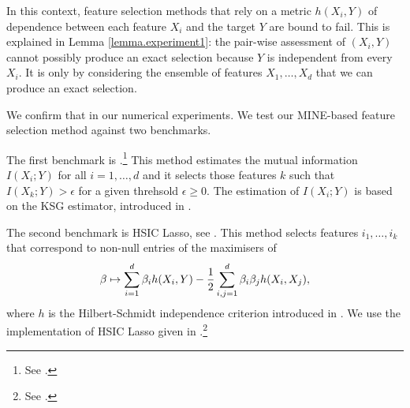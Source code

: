 In this context,
feature selection methods
that rely on a metric $h(X_i, Y)$ of dependence between 
each feature $X_i$ and the target $Y$ are bound to fail.
This is explained in Lemma \ref{lemma.experiment1}:
the pair-wise assessment of $(X_i, Y)$ 
cannot possibly produce an exact selection
because $Y$ is independent from every $X_i$. 
It is only by considering 
the ensemble of features $X_1, \dots, X_d$ 
that we can produce an exact selection.

We confirm that in our numerical experiments. 
We test 
our MINE-based feature selection method 
against 
two benchmarks.

The first benchmark is 
.\footnote{
See
.
}
This method estimates the mutual information 
$I(X_i; Y)$ for all $i = 1, \dots, d$
and 
it selects those features $k$ such that 
$I(X_k; Y) > \epsilon$
for a given threhsold $\epsilon \geq 0$. 
The estimation of $I(X_i; Y)$ is based on the KSG estimator, 
introduced in 
\cite{KSG04est}.

The second benchmark is
HSIC Lasso,
see 
\cite{YJSXS14hig}.
This method 
selects features $i_1, \dots, i_k$
that correspond to non-null entries of the 
maximisers of 
\begin{equation*}
	\beta \mapsto 
	\sum_{i=1}^{d} \beta_i h(X_i, Y)
	-\frac{1}{2}
	\sum_{i,j = 1}^{d} \beta_i \beta_j h(X_i, X_j),
\end{equation*}
where $h$ is the Hilbert-Schmidt independence criterion 
introduced in 
\cite{GBSS05mea}.
We use the implementation of HSIC Lasso
given in
.\footnote{
See .
}

